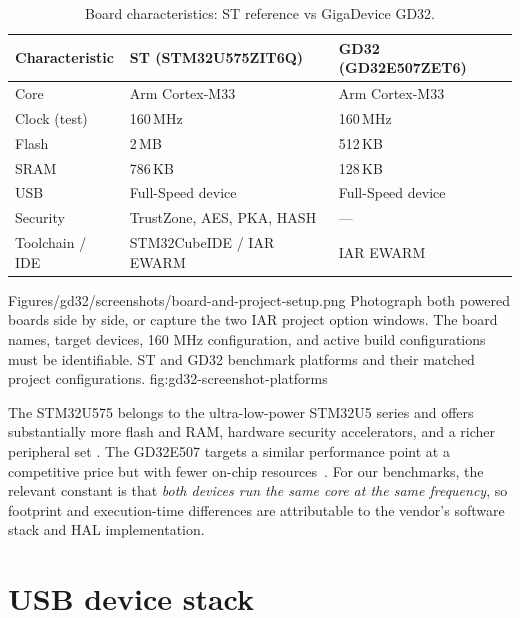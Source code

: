 \begin{table}[H]
  \centering
  \caption{Board characteristics: ST reference vs GigaDevice GD32.}
  \label{tab:gd32-boards}
  \begin{tabularx}{\textwidth}{l X X}
    \toprule
    \textbf{Characteristic} & \textbf{ST (STM32U575ZIT6Q)} & \textbf{GD32 (GD32E507ZET6)} \\
    \midrule
    Core              & Arm Cortex-M33              & Arm Cortex-M33 \\
    Clock (test)      & 160\,MHz                    & 160\,MHz \\
    Flash             & 2\,MB                       & 512\,KB \\
    SRAM              & 786\,KB                     & 128\,KB \\
    USB               & Full-Speed device            & Full-Speed device \\
    Security          & TrustZone, AES, PKA, HASH    & --- \\
    Toolchain / IDE   & STM32CubeIDE / IAR EWARM     & IAR EWARM \\
    \bottomrule
  \end{tabularx}
\end{table}

  \reportscreenshot
    {Figures/gd32/screenshots/board-and-project-setup.png}
    {Photograph both powered boards side by side, or capture the two IAR project option windows. The board names, target devices, 160 MHz configuration, and active build configurations must be identifiable.}
    {ST and GD32 benchmark platforms and their matched project configurations.}
    {fig:gd32-screenshot-platforms}

The STM32U575 belongs to the ultra-low-power STM32U5 series and offers substantially more
flash and RAM, hardware security accelerators, and a richer peripheral set
\cite{stm32u575-ds}. The GD32E507 targets a similar performance point at a competitive
price but with fewer on-chip resources~\cite{gd32e507-ds}. For our benchmarks, the
relevant constant is that \emph{both devices run the same core at the same frequency},
so footprint and execution-time differences are attributable to the vendor's software stack
and HAL implementation.

\section{USB device stack}
\label{sec:gd32-usb}

